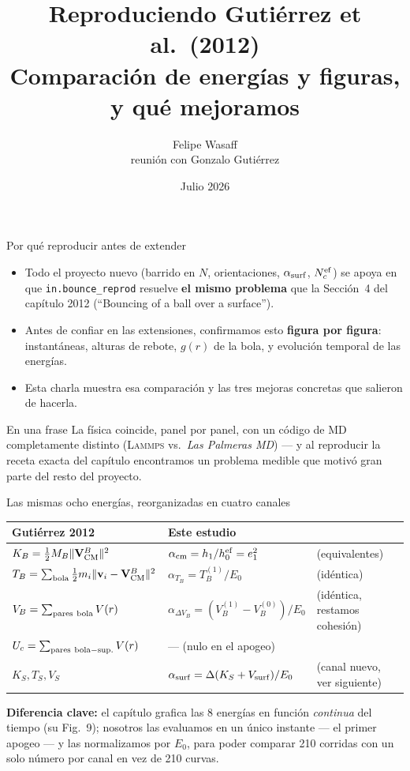 \documentclass[11pt,aspectratio=169]{beamer}
\title[Reproducción 2012]{Reproduciendo Gutiérrez et al.\ (2012)\\
\large Comparación de energías y figuras, y qué mejoramos}
\author[F. Wasaff]{Felipe Wasaff\\
\footnotesize reunión con Gonzalo Gutiérrez}
\institute[IMA-PUCV]{Instituto de Matemáticas, PUCV}
\date{Julio 2026}
\newcommand{\lammps}{\textsc{Lammps}}
\begin{document}
\begin{frame}
\titlepage
\end{frame}

\begin{frame}{Por qué reproducir antes de extender}
\begin{itemize}
    \item Todo el proyecto nuevo (barrido en $N$, orientaciones,
    $\alpha_{\rm surf}$, $N_c^{\rm ef}$) se apoya en que
    \texttt{in.bounce\_reprod} resuelve \textbf{el mismo problema} que la
    Sección~4 del capítulo 2012 (``Bouncing of a ball over a surface'').
    \item Antes de confiar en las extensiones, confirmamos esto
    \textbf{figura por figura}: instantáneas, alturas de rebote,
    $g(r)$ de la bola, y evolución temporal de las energías.
    \item Esta charla muestra esa comparación y las tres mejoras
    concretas que salieron de hacerla.
\end{itemize}
\medskip
\begin{alertblock}{En una frase}
La física coincide, panel por panel, con un código de MD completamente
distinto (\lammps{} vs.\ \emph{Las Palmeras MD}) --- y al reproducir la
receta exacta del capítulo encontramos un problema medible que motivó
gran parte del resto del proyecto.
\end{alertblock}
\end{frame}

\begin{frame}{Las mismas ocho energías, reorganizadas en cuatro canales}
\small
\begin{tabular}{lll}
\toprule
Gutiérrez 2012 & Este estudio & \\
\midrule
$K_B=\tfrac12M_B\|\mathbf V_{\rm CM}^B\|^2$ &
    $\alpha_{\rm cm}=h_1/h_0^{\rm ef}=e_1^2$ & (equivalentes) \\
$T_B=\sum_{\rm bola}\tfrac12m_i\|\mathbf v_i-\mathbf V_{\rm CM}^B\|^2$ &
    $\alpha_{T_B}=T_B^{(1)}/E_0$ & (idéntica) \\
$V_B=\sum_{\rm pares\ bola}V(r)$ &
    $\alpha_{\Delta V_B}=(V_B^{(1)}-V_B^{(0)})/E_0$ & (idéntica, restamos cohesión) \\
$U_c=\sum_{\rm pares\ bola-sup.}V(r)$ &
    --- (nulo en el apogeo) & \\
$K_S,T_S,V_S$ &
    $\alpha_{\rm surf}=\Delta(K_S+V_{\rm surf})/E_0$ & (canal nuevo, ver siguiente) \\
\bottomrule
\end{tabular}
\bigskip

\textbf{Diferencia clave:} el capítulo grafica las 8 energías en función
\emph{continua} del tiempo (su Fig.~9); nosotros las evaluamos en un
único instante --- el primer apogeo --- y las normalizamos por $E_0$, para
poder comparar 210 corridas con un solo número por canal en vez de
210 curvas.
\end{frame}
\end{document}
